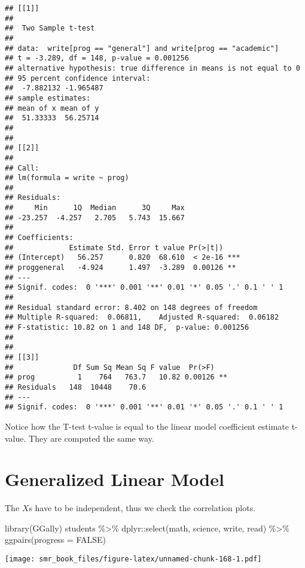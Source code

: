 \documentclass[
  oneside]{book}
\newenvironment{Shaded}{\begin{snugshade}}{\end{snugshade}}
\newcommand{\AttributeTok}[1]{\textcolor[rgb]{0.77,0.63,0.00}{#1}}
\newcommand{\ConstantTok}[1]{\textcolor[rgb]{0.00,0.00,0.00}{#1}}
\newcommand{\FunctionTok}[1]{\textcolor[rgb]{0.00,0.00,0.00}{#1}}
\newcommand{\NormalTok}[1]{#1}
\newcommand{\SpecialCharTok}[1]{\textcolor[rgb]{0.00,0.00,0.00}{#1}}
\begin{document}
\begin{verbatim}
## [[1]]
## 
##  Two Sample t-test
## 
## data:  write[prog == "general"] and write[prog == "academic"]
## t = -3.289, df = 148, p-value = 0.001256
## alternative hypothesis: true difference in means is not equal to 0
## 95 percent confidence interval:
##  -7.882132 -1.965487
## sample estimates:
## mean of x mean of y 
##  51.33333  56.25714 
## 
## 
## [[2]]
## 
## Call:
## lm(formula = write ~ prog)
## 
## Residuals:
##     Min      1Q  Median      3Q     Max 
## -23.257  -4.257   2.705   5.743  15.667 
## 
## Coefficients:
##             Estimate Std. Error t value Pr(>|t|)    
## (Intercept)   56.257      0.820  68.610  < 2e-16 ***
## proggeneral   -4.924      1.497  -3.289  0.00126 ** 
## ---
## Signif. codes:  0 '***' 0.001 '**' 0.01 '*' 0.05 '.' 0.1 ' ' 1
## 
## Residual standard error: 8.402 on 148 degrees of freedom
## Multiple R-squared:  0.06811,    Adjusted R-squared:  0.06182 
## F-statistic: 10.82 on 1 and 148 DF,  p-value: 0.001256
## 
## 
## [[3]]
##              Df Sum Sq Mean Sq F value  Pr(>F)   
## prog          1    764   763.7   10.82 0.00126 **
## Residuals   148  10448    70.6                   
## ---
## Signif. codes:  0 '***' 0.001 '**' 0.01 '*' 0.05 '.' 0.1 ' ' 1
\end{verbatim}

Notice how the T-test t-value is equal to the linear model coefficient estimate t-value.
They are computed the same way.

\hypertarget{generalized-linear-model}{%
\section{Generalized Linear Model}\label{generalized-linear-model}}

The \(X\)s have to be independent, thus we check the correlation plots.

\begin{Shaded}
\begin{Highlighting}[]
\FunctionTok{library}\NormalTok{(GGally)}
\NormalTok{students }\SpecialCharTok{\%\textgreater{}\%}
\NormalTok{  dplyr}\SpecialCharTok{::}\FunctionTok{select}\NormalTok{(math, science, write, read) }\SpecialCharTok{\%\textgreater{}\%}
  \FunctionTok{ggpairs}\NormalTok{(}\AttributeTok{progress =} \ConstantTok{FALSE}\NormalTok{)}
\end{Highlighting}
\end{Shaded}

\texttt{[image: smr\_book\_files/figure-latex/unnamed-chunk-168-1.pdf]}
\end{document}
